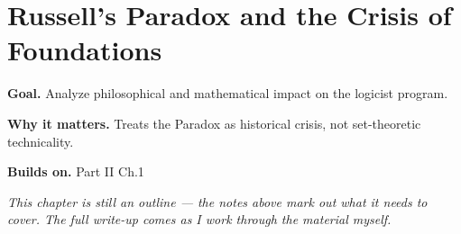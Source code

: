 \chapter{Russell's Paradox and the Crisis of Foundations}
\label{ch:14-metamathematics-02}

\begin{chapterintro}
\textbf{Goal.} Analyze philosophical and mathematical impact on the logicist program.

\textbf{Why it matters.} Treats the Paradox as historical crisis, not set-theoretic technicality.

\textbf{Builds on.} Part II Ch.1
\end{chapterintro}

\textit{This chapter is still an outline --- the notes above mark out what it needs to cover. The full write-up comes as I work through the material myself.}
